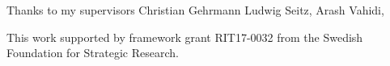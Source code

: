 Thanks to my supervisors Christian Gehrmann Ludwig Seitz, Arash Vahidi, 

This work supported by framework grant RIT17-0032 from the Swedish Foundation for Strategic Research.